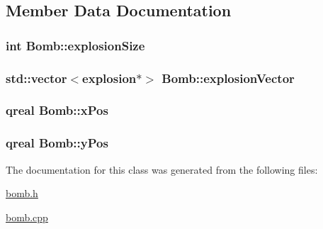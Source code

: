 \subsection{Member Data Documentation}
\hypertarget{class_bomb_a7576bf99d4bcfbc7dda365511ca2fcd7}{
\subsubsection[{explosion\-Size}]{\setlength{\rightskip}{0pt plus 5cm}int Bomb\-::explosion\-Size\hspace{0.3cm}{\ttfamily [protected]}}}\label{class_bomb_a7576bf99d4bcfbc7dda365511ca2fcd7}
\hypertarget{class_bomb_a03d27f3d615aba4b77f83427912a7de6}{
\subsubsection[{explosion\-Vector}]{\setlength{\rightskip}{0pt plus 5cm}std\-::vector$<${\bf explosion}$\ast$$>$ Bomb\-::explosion\-Vector\hspace{0.3cm}{\ttfamily [protected]}}}\label{class_bomb_a03d27f3d615aba4b77f83427912a7de6}
\hypertarget{class_bomb_ac2068167b771ed338aa17c99524b8131}{
\subsubsection[{x\-Pos}]{\setlength{\rightskip}{0pt plus 5cm}qreal Bomb\-::x\-Pos\hspace{0.3cm}{\ttfamily [protected]}}}\label{class_bomb_ac2068167b771ed338aa17c99524b8131}
\hypertarget{class_bomb_a0d1028a49b33b08f5c96a943fab0beff}{
\subsubsection[{y\-Pos}]{\setlength{\rightskip}{0pt plus 5cm}qreal Bomb\-::y\-Pos\hspace{0.3cm}{\ttfamily [protected]}}}\label{class_bomb_a0d1028a49b33b08f5c96a943fab0beff}


The documentation for this class was generated from the following files\-:\begin{DoxyCompactItemize}
\item 
\hyperlink{bomb_8h}{bomb.\-h}\item 
\hyperlink{bomb_8cpp}{bomb.\-cpp}\end{DoxyCompactItemize}
